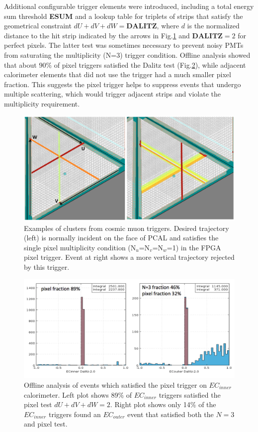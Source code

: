 Additional configurable trigger elements were introduced, including a total energy sum threshold \textbf{ESUM} and a lookup table for triplets of strips that satisfy the geometrical constraint $dU+dV+dW=\textbf{DALITZ}$, where $d$ is the normalized distance to the hit strip indicated by the arrows in Fig.\ref{fig:pcal_cosmic_1} and $\textbf{DALITZ}=2$ for perfect pixels.  The latter test was sometimes necessary to prevent noisy PMTs from saturating the multiplicity (N=3) trigger condition.  Offline analysis showed that about $90\%$ of pixel triggers satisfied the Dalitz test (Fig.\ref{fig:ec_offline}), while adjacent calorimeter elements that did not use the trigger had a much smaller pixel fraction.  This suggests the pixel trigger helps to suppress events that undergo multiple scattering, which would trigger adjacent strips and violate the multiplicity requirement.

\begin{figure}[!htb]
 	\centering
  	\includegraphics[width=0.95\columnwidth,keepaspectratio]{img/TwoClusters.png}
 	\caption{Examples of clusters from cosmic muon triggers.  Desired trajectory (left) is normally incident on the face of PCAL and satisfies the single pixel multiplicity condition (N$_u$=N$_v$=N$_w$=1) in the FPGA pixel trigger.  Event at right shows a more vertical trajectory rejected by this trigger.}
	\label{fig:pcal_cosmic_1}
\end{figure}

\begin{figure}[!htb]
 	\centering
  	\includegraphics[width=1.0\columnwidth,keepaspectratio]{img/PixelFraction.png}
 	\caption{Offline analysis of events which satisfied the pixel trigger on $EC_{inner}$  calorimeter.  Left plot shows 89$\%$ of $EC_{inner}$  triggers satisfied the pixel test $dU+dV+dW=2$.  Right plot shows only 14$\%$ of the $EC_{inner}$ triggers found an $EC_{outer}$ event that satisfied both the $N=3$ and pixel test.}
	\label{fig:ec_offline}
\end{figure}


